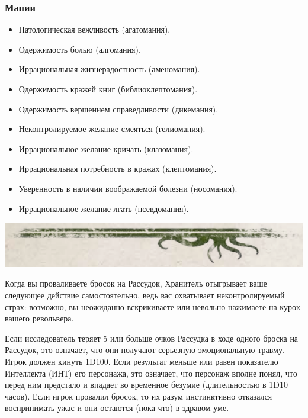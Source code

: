 \documentclass[letterpaper,twocolumn,openany, twoside, 11pt, usenames]{cocbook}
\begin{document}
\begin{fullcocpaperbox}{}{}
\begin{multicols}{2}
  \subsubsection*{Мании}
  \begin{itemize}[leftmargin=4mm]
  \item Патологическая вежливость (агатомания).
  \item Одержимость болью (алгомания).
  \item Иррациональная жизнерадостность (аменомания).
  \item Одержимость кражей книг (библиоклептомания).
  \item Одержимость вершением справедливости (дикемания).
  \item Неконтролируемое желание смеяться (гелиомания).
  \item Иррациональное желание кричать (клазомания).
  \item Иррациональная потребность в кражах (клептомания).
  \item Уверенность в наличии воображаемой болезни (носомания).
  \item Иррациональное желание лгать (псевдомания).
\end{itemize}
  \end{multicols}
  \includegraphics[width=\linewidth]{img/bottom.png}
\end{fullcocpaperbox}

Когда вы проваливаете бросок на Рассудок, Хранитель отыгрывает ваше следующее действие самостоятельно, ведь вас охватывает неконтролируемый страх: возможно, вы неожиданно вскрикиваете или невольно нажимаете на курок вашего револьвера.

Если исследователь теряет 5 или больше очков Рассудка в ходе одного броска на Рассудок, это означает, что они получают серьезную эмоциональную травму. Игрок должен кинуть 1D100. Если результат меньше или равен показателю Интеллекта (ИНТ) его персонажа, это означает, что персонаж вполне понял, что перед ним предстало и впадает во временное безумие (длительностью в  1D10 часов). Если игрок провалил бросок, то их разум инстинктивно отказался воспринимать ужас и они остаются (пока что) в здравом уме.
\end{document}
